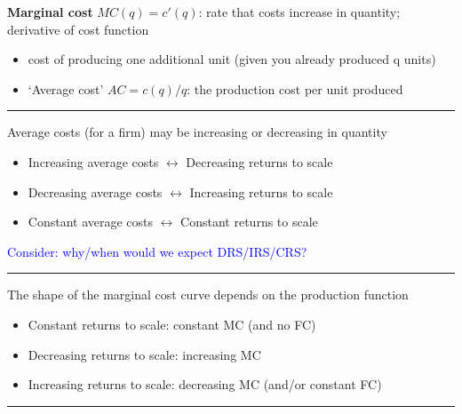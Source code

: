 \documentclass[]{article}
\providecommand{\tightlist}{%
  \setlength{\itemsep}{0pt}\setlength{\parskip}{0pt}}
\begin{document}
\textbf{Marginal cost} \(MC(q)=c'(q)\): rate that costs increase in quantity; derivative of cost function

\begin{itemize}
\tightlist
\item
  cost of producing one additional unit (given you already produced q units)
\end{itemize}

\bigskip

\bigskip

\begin{itemize}
\tightlist
\item
  `Average cost' \(AC=c(q)/q\): the production cost per unit produced
\end{itemize}

\begin{center}\rule{0.5\linewidth}{\linethickness}\end{center}

Average costs (for a firm) may be increasing or decreasing in quantity

\bigskip

\begin{itemize}
\item
  Increasing average costs \(\leftrightarrow\) Decreasing returns to scale
\item
  Decreasing average costs \(\leftrightarrow\) Increasing returns to scale
\item
  Constant average costs \(\leftrightarrow\) Constant returns to scale
\end{itemize}

\bigskip

\textcolor{blue}{Consider: why/when would we expect DRS/IRS/CRS?}

\begin{center}\rule{0.5\linewidth}{\linethickness}\end{center}

The shape of the marginal cost curve depends on the production function

\begin{itemize}
\item
  Constant returns to scale: constant MC (and no FC)
\item
  Decreasing returns to scale: increasing MC
\item
  Increasing returns to scale: decreasing MC (and/or constant FC)
\end{itemize}

\begin{center}\rule{0.5\linewidth}{\linethickness}\end{center}
\end{document}
